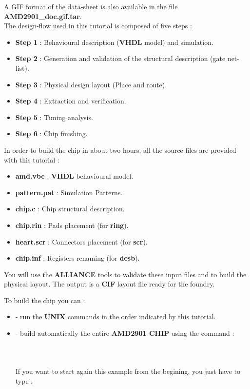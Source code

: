 \documentclass[11pt,a4]{article}
\begin{document}
A GIF format of the data-sheet is also available in the file  {\bf AMD2901\_doc.gif.tar}.
\\
The design-flow used in this tutorial is composed of five steps :
\begin{itemize}
\item {\bf Step 1} : Behavioural description ({\bf VHDL} model) and simulation.
\item {\bf Step 2} : Generation and validation of the structural description 
(gate net-list).
\item {\bf Step 3} : Physical design layout (Place and route).
\item {\bf Step 4} : Extraction and verification.
\item {\bf Step 5} : Timing analysis.
\item {\bf Step 6} : Chip finishing.
\end{itemize}

In order to build the chip in about two hours, all the source files
are provided with this tutorial : 
\begin{itemize}
\item {\bf amd.vbe} : {\bf VHDL} behavioural model.
\item {\bf pattern.pat} : Simulation Patterns.
\item {\bf chip.c} : Chip structural description.
\item {\bf chip.rin} : Pads placement (for {\bf ring}).
\item {\bf heart.scr} : Connectors placement (for {\bf scr}).
\item {\bf chip.inf} : Registers renaming (for {\bf desb}).
\end{itemize}

You will use the {\bf ALLIANCE} tools to validate these input files
and to build the physical layout. 
The output is a {\bf CIF} layout file ready for the foundry.

To build the chip you can :
\begin{itemize}
\item - run the {\bf UNIX} commands in the order indicated by this tutorial.
\item - build automatically the entire {\bf AMD2901 CHIP} using the command : \\
\\
\\
\\
If you want to start again this example from the begining,
you just have to type :\\
\\
\end{itemize}
\end{document}
